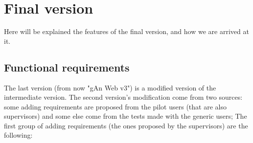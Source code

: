 
\chapter{Final version} %

\label{Chapter5} %

Here will be explained the features of the final version, and how we are arrived at it.

\section{Functional requirements}

The last version (from now "gAn Web v3") is a modified version of the intermediate version. 
The second version's modification come from two sources: some adding requirements are proposed from the pilot users (that are also supervisors) and some else come from the tests made with the generic users; The first group of  adding requirements (the ones proposed by the supervisors) are the following:

